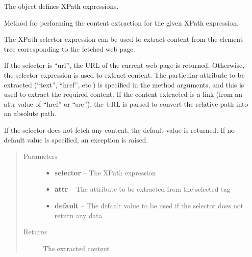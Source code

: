 \documentclass[letterpaper,12pt,english]{sphinxmanual}
\begin{document}
\begin{fulllineitems}
\label{implementation/selectors:scrapple.selectors.xpath.XpathSelector}
The  object defines XPath expressions.

\begin{fulllineitems}
\label{implementation/selectors:scrapple.selectors.xpath.XpathSelector.extract_content}
Method for performing the content extraction for the given XPath expression.

The XPath selector expression can be used to extract content            from the element tree corresponding to the fetched web page.

If the selector is ``url'', the URL of the current web page is returned.
Otherwise, the selector expression is used to extract content. The particular           attribute to be extracted (``text'', ``href'', etc.) is specified in the method             arguments, and this is used to extract the required content. If the content             extracted is a link (from an attr value of ``href'' or ``src''), the URL is parsed          to convert the relative path into an absolute path.

If the selector does not fetch any content, the default value is returned.              If no default value is specified, an exception is raised.
\begin{quote}\begin{description}
\item[{Parameters}] \leavevmode\begin{itemize}
\item {} 
\textbf{selector} -- The XPath expression

\item {} 
\textbf{attr} -- The attribute to be extracted from the selected tag

\item {} 
\textbf{default} -- The default value to be used if the selector does not return any data

\end{itemize}

\item[{Returns}] \leavevmode
The extracted content

\end{description}\end{quote}


\end{fulllineitems}
\end{fulllineitems}
\end{document}
